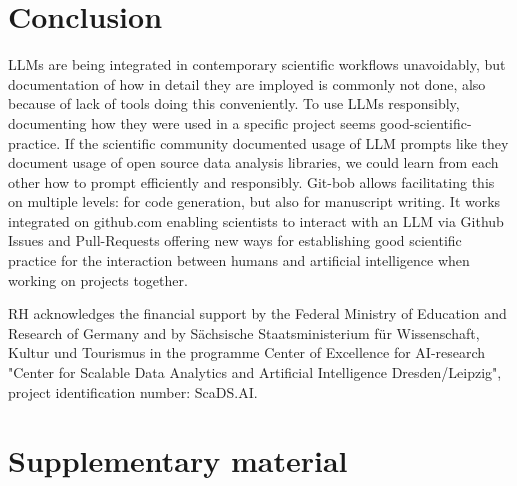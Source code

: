 \documentclass{ecai}
\begin{document}
\section{Conclusion}

LLMs are being integrated in contemporary scientific workflows unavoidably, but documentation of how in detail they are imployed is commonly not done, also because of lack of tools doing this conveniently. To use LLMs responsibly, documenting how they were used in a specific project seems good-scientific-practice. If the scientific community documented usage of LLM prompts like they document usage of open source data analysis libraries, we could learn from each other how to prompt efficiently and responsibly. Git-bob allows facilitating this on multiple levels: for code generation, but also for manuscript writing. It works integrated on github.com enabling scientists to interact with an LLM via Github Issues and Pull-Requests offering new ways for establishing good scientific practice for the interaction between humans and artificial intelligence when working on projects together.



\begin{ack}
RH acknowledges the financial support by the Federal Ministry of Education and Research of Germany and by Sächsische Staatsministerium für Wissenschaft, Kultur und Tourismus in the programme Center of Excellence for AI-research "Center for Scalable Data Analytics and Artificial Intelligence Dresden/Leipzig", project identification number: ScaDS.AI.

\end{ack}





\section{Supplementary material}
\setcounter{figure}{0} 
\renewcommand{\thefigure}{S\arabic{figure}}
\end{document}
